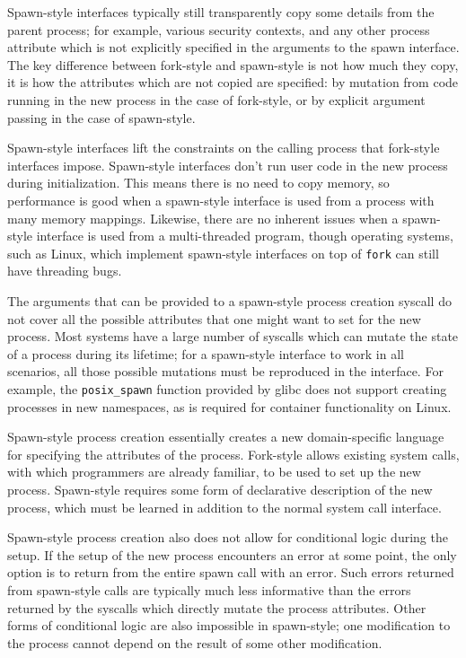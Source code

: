 \documentclass[letterpaper,twocolumn,10pt]{article}
\begin{document}
Spawn-style interfaces typically still transparently copy some details from the parent process;
for example, various security contexts,
and any other process attribute which is not explicitly specified in the arguments to the spawn interface.
The key difference between fork-style and spawn-style is not how much they copy,
it is how the attributes which are not copied are specified:
by mutation from code running in the new process in the case of fork-style,
or by explicit argument passing in the case of spawn-style.

Spawn-style interfaces lift the constraints on the calling process that fork-style interfaces impose.
Spawn-style interfaces don't run user code in the new process during initialization.
This means there is no need to copy memory,
so performance is good when a spawn-style interface is used from a process with many memory mappings.
Likewise, there are no inherent issues when a spawn-style interface is used from a multi-threaded program,
though operating systems, such as Linux,
which implement spawn-style interfaces on top of \texttt{fork} can still have threading bugs.

The arguments that can be provided to a spawn-style process creation syscall
do not cover all the possible attributes that one might want to set for the new process.
Most systems have a large number of syscalls which can mutate the state of a process during its lifetime;
for a spawn-style interface to work in all scenarios,
all those possible mutations must be reproduced in the interface.
For example, the \texttt{posix\_spawn} function provided by glibc does not support creating processes in new namespaces,
as is required for container functionality on Linux.

Spawn-style process creation
essentially creates a new domain-specific language for specifying the attributes of the process.
Fork-style allows existing system calls,
with which programmers are already familiar,
to be used to set up the new process.
Spawn-style requires some form of declarative description of the new process,
which must be learned in addition to the normal system call interface.

Spawn-style process creation also does not allow for conditional logic during the setup.
If the setup of the new process encounters an error at some point,
the only option is to return from the entire spawn call with an error.
Such errors returned from spawn-style calls
are typically much less informative
than the errors returned by the syscalls which directly mutate the process attributes.
Other forms of conditional logic are also impossible in spawn-style;
one modification to the process cannot depend on the result of some other modification.
\end{document}
